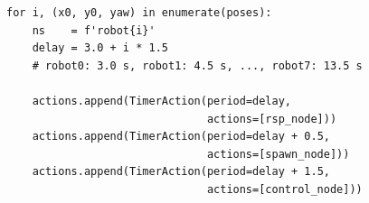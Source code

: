 \begin{figure}[t]
\centering
\begin{lstlisting}[style=python,
    caption={Esquema de retardos escalonados para $n$ robots.},
    label={lst:esquema_delays}]
for i, (x0, y0, yaw) in enumerate(poses):
    ns    = f'robot{i}'
    delay = 3.0 + i * 1.5
    # robot0: 3.0 s, robot1: 4.5 s, ..., robot7: 13.5 s

    actions.append(TimerAction(period=delay,
                               actions=[rsp_node]))
    actions.append(TimerAction(period=delay + 0.5,
                               actions=[spawn_node]))
    actions.append(TimerAction(period=delay + 1.5,
                               actions=[control_node]))
\end{lstlisting}
\end{figure}
